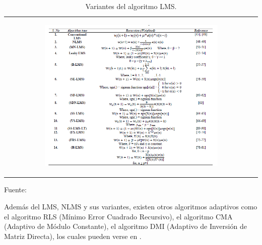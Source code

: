 \begin{enumerate}
\begin{enumerate}
\begin{center}
\begin{table}[h!]
\centering
\vskip -0.2cm
\caption{\small{Variantes del algoritmo LMS.}}
\label{table:tabla24}
\begin{tabular}{c}
\begin{minipage}{.9\textwidth}
\begin{center}
\includegraphics[width=0.7\textwidth]{Imagenes/Cap2/image019}
\end{center}
\end{minipage}
\end{tabular}
\begin{center}
\vskip 0.2cm
{\small{Fuente: \cite{shubhra}}}
\end{center}
\end{table}
\end{center}
\vskip -0.5cm
Además del LMS, NLMS y sus variantes, existen otros algoritmos adaptivos como el algoritmo RLS (Mínimo Error Cuadrado Recursivo), el algoritmo CMA (Adaptivo de Módulo Constante), el algoritmo DMI (Adaptivo de Inversión de Matriz Directa), los cuales pueden verse en \citep{shubhra}.
\end{enumerate}


\end{enumerate}
